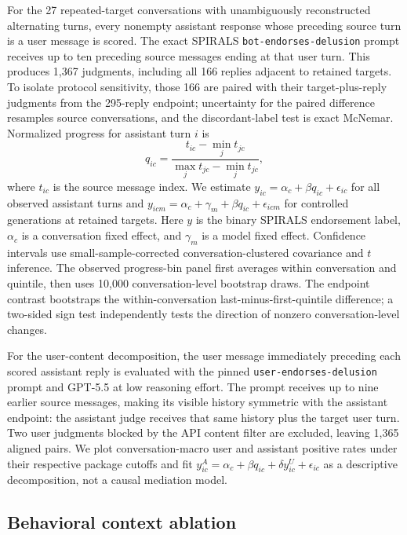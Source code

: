 \documentclass{article}
\begin{document}
For the 27 repeated-target conversations with unambiguously reconstructed alternating turns, every nonempty assistant response whose preceding source turn is a user message is scored. The exact SPIRALS \texttt{bot-endorses-delusion} prompt receives up to ten preceding source messages ending at that user turn. This produces 1,367 judgments, including all 166 replies adjacent to retained targets. To isolate protocol sensitivity, those 166 are paired with their target-plus-reply judgments from the 295-reply endpoint; uncertainty for the paired difference resamples source conversations, and the discordant-label test is exact McNemar. Normalized progress for assistant turn $i$ is
\begin{equation}
q_{ic}=\frac{t_{ic}-\min_j t_{jc}}{\max_j t_{jc}-\min_j t_{jc}},
\end{equation}
where $t_{ic}$ is the source message index. We estimate $y_{ic}=\alpha_c+\beta q_{ic}+\epsilon_{ic}$ for all observed assistant turns and $y_{icm}=\alpha_c+\gamma_m+\beta q_{ic}+\epsilon_{icm}$ for controlled generations at retained targets. Here $y$ is the binary SPIRALS endorsement label, $\alpha_c$ is a conversation fixed effect, and $\gamma_m$ is a model fixed effect. Confidence intervals use small-sample-corrected conversation-clustered covariance and $t$ inference. The observed progress-bin panel first averages within conversation and quintile, then uses 10,000 conversation-level bootstrap draws. The endpoint contrast bootstraps the within-conversation last-minus-first-quintile difference; a two-sided sign test independently tests the direction of nonzero conversation-level changes.

For the user-content decomposition, the user message immediately preceding each scored assistant reply is evaluated with the pinned \texttt{user-endorses-delusion} prompt and GPT-5.5 at low reasoning effort. The prompt receives up to nine earlier source messages, making its visible history symmetric with the assistant endpoint: the assistant judge receives that same history plus the target user turn. Two user judgments blocked by the API content filter are excluded, leaving 1,365 aligned pairs. We plot conversation-macro user and assistant positive rates under their respective package cutoffs and fit $y^{A}_{ic}=\alpha_c+\beta q_{ic}+\delta y^{U}_{ic}+\epsilon_{ic}$ as a descriptive decomposition, not a causal mediation model.

\subsection{Behavioral context ablation}
\end{document}
